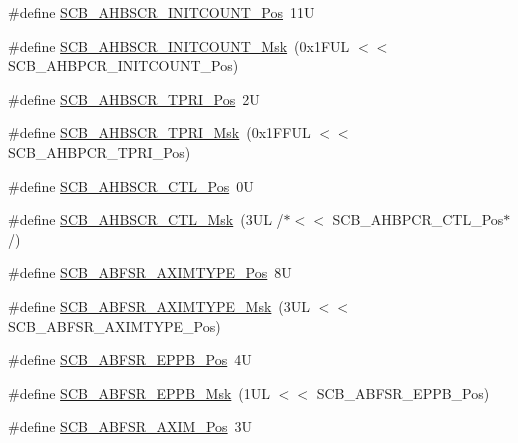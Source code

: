 \begin{DoxyCompactItemize}
\item 
\#define \hyperlink{group___c_m_s_i_s___s_c_b_ga47f55c7d1b161535caff50e7a35dc734}{S\-C\-B\-\_\-\-A\-H\-B\-S\-C\-R\-\_\-\-I\-N\-I\-T\-C\-O\-U\-N\-T\-\_\-\-Pos}~11\-U
\item 
\#define \hyperlink{group___c_m_s_i_s___s_c_b_gabb766ac9d99ea8272387b6946e80ce43}{S\-C\-B\-\_\-\-A\-H\-B\-S\-C\-R\-\_\-\-I\-N\-I\-T\-C\-O\-U\-N\-T\-\_\-\-Msk}~(0x1\-F\-U\-L $<$$<$ S\-C\-B\-\_\-\-A\-H\-B\-P\-C\-R\-\_\-\-I\-N\-I\-T\-C\-O\-U\-N\-T\-\_\-\-Pos)
\item 
\#define \hyperlink{group___c_m_s_i_s___s_c_b_gabf98193e45e8bcb57caa28e8dc6df199}{S\-C\-B\-\_\-\-A\-H\-B\-S\-C\-R\-\_\-\-T\-P\-R\-I\-\_\-\-Pos}~2\-U
\item 
\#define \hyperlink{group___c_m_s_i_s___s_c_b_gab5303ca99ab56df4b6cd6298dc0e1c32}{S\-C\-B\-\_\-\-A\-H\-B\-S\-C\-R\-\_\-\-T\-P\-R\-I\-\_\-\-Msk}~(0x1\-F\-F\-U\-L $<$$<$ S\-C\-B\-\_\-\-A\-H\-B\-P\-C\-R\-\_\-\-T\-P\-R\-I\-\_\-\-Pos)
\item 
\#define \hyperlink{group___c_m_s_i_s___s_c_b_gabfdcfa4029b1249d45a649ff37c04d65}{S\-C\-B\-\_\-\-A\-H\-B\-S\-C\-R\-\_\-\-C\-T\-L\-\_\-\-Pos}~0\-U
\item 
\#define \hyperlink{group___c_m_s_i_s___s_c_b_gab2aa81692dfec47f8b69a3f425ca1022}{S\-C\-B\-\_\-\-A\-H\-B\-S\-C\-R\-\_\-\-C\-T\-L\-\_\-\-Msk}~(3\-U\-L /$\ast$$<$$<$ S\-C\-B\-\_\-\-A\-H\-B\-P\-C\-R\-\_\-\-C\-T\-L\-\_\-\-Pos$\ast$/)
\item 
\#define \hyperlink{group___c_m_s_i_s___s_c_b_gad89888a5399f2a229270d6dc9a8eaa85}{S\-C\-B\-\_\-\-A\-B\-F\-S\-R\-\_\-\-A\-X\-I\-M\-T\-Y\-P\-E\-\_\-\-Pos}~8\-U
\item 
\#define \hyperlink{group___c_m_s_i_s___s_c_b_ga91783597f0721644a1ab1919755bb6ee}{S\-C\-B\-\_\-\-A\-B\-F\-S\-R\-\_\-\-A\-X\-I\-M\-T\-Y\-P\-E\-\_\-\-Msk}~(3\-U\-L $<$$<$ S\-C\-B\-\_\-\-A\-B\-F\-S\-R\-\_\-\-A\-X\-I\-M\-T\-Y\-P\-E\-\_\-\-Pos)
\item 
\#define \hyperlink{group___c_m_s_i_s___s_c_b_ga2d943581f93e2425e0a22a0d45b9f0a6}{S\-C\-B\-\_\-\-A\-B\-F\-S\-R\-\_\-\-E\-P\-P\-B\-\_\-\-Pos}~4\-U
\item 
\#define \hyperlink{group___c_m_s_i_s___s_c_b_gac7bbc98af76d3de2713a0eb0c6c2e613}{S\-C\-B\-\_\-\-A\-B\-F\-S\-R\-\_\-\-E\-P\-P\-B\-\_\-\-Msk}~(1\-U\-L $<$$<$ S\-C\-B\-\_\-\-A\-B\-F\-S\-R\-\_\-\-E\-P\-P\-B\-\_\-\-Pos)
\item 
\#define \hyperlink{group___c_m_s_i_s___s_c_b_ga48c7a6de20e2823c0dc74d78c5ef7992}{S\-C\-B\-\_\-\-A\-B\-F\-S\-R\-\_\-\-A\-X\-I\-M\-\_\-\-Pos}~3\-U

\end{DoxyCompactItemize}
